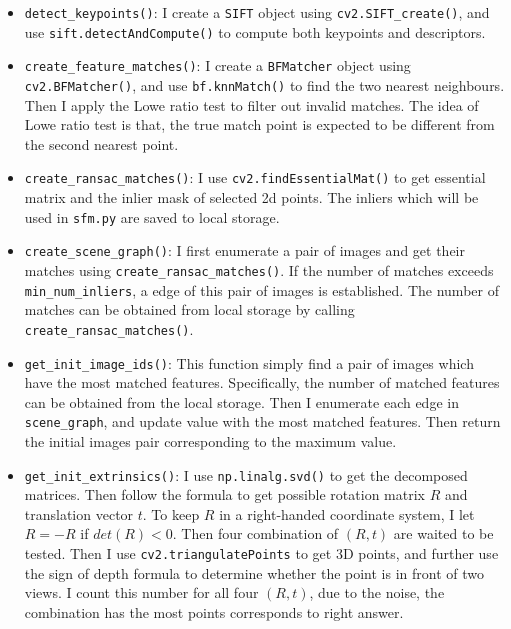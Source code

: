 \begin{itemize}
    \item \texttt{detect\_keypoints()}: I create a \texttt{SIFT} object using \texttt{cv2.SIFT\_create()}, and use \texttt{sift.detectAndCompute()} to compute both keypoints and descriptors.
    
    \item \texttt{create\_feature\_matches()}:  I create a \texttt{BFMatcher} object using \texttt{cv2.BFMatcher()}, and use \texttt{bf.knnMatch()} to find the two nearest neighbours. Then I apply the Lowe ratio test to filter out invalid matches. The idea of Lowe ratio test is that, the true match point is expected to be different from the second nearest point.
    
    \item \texttt{create\_ransac\_matches()}: I use \texttt{cv2.findEssentialMat()} to get essential matrix and the inlier mask of selected 2d points. The inliers which will be used in \texttt{sfm.py} are saved to local storage.
    
    \item \texttt{create\_scene\_graph()}: I first enumerate a pair of images and get their matches using \texttt{create\_ransac\_matches()}. If the number of matches exceeds \texttt{min\_num\_inliers}, a edge of this pair of images is established. The number of matches can be obtained from local storage by calling \texttt{create\_ransac\_matches()}.
    
    \item \texttt{get\_init\_image\_ids()}: This function simply find a pair of images which have the most matched features. Specifically, the number of matched features can be obtained from the local storage.
    Then I enumerate each edge in \texttt{scene\_graph}, and update value with the most matched features. Then return the initial images pair corresponding to the maximum value.
    
    \item \texttt{get\_init\_extrinsics()}: I use \texttt{np.linalg.svd()} to get the decomposed matrices. Then follow the formula to get possible rotation matrix $R$ and translation vector $t$. To keep $R$ in a right-handed coordinate system, I let $R=-R$ if $det(R)<0$. Then four combination of $(R, t)$ are waited to be tested. Then I use \texttt{cv2.triangulatePoints} to get 3D points, and further use the sign of depth formula to determine whether the point is in front of two views. I count this number for all four $(R, t)$, due to the noise, the combination has the most points corresponds to right answer.


\end{itemize}
